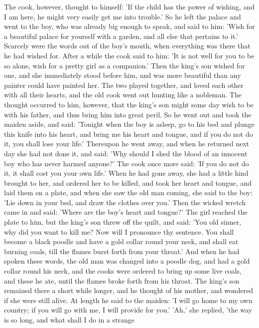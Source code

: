 \documentclass[12pt]{book}
\begin{document}
The cook, however, thought to himself: 'If the child has the power of
wishing, and I am here, he might very easily get me into trouble.' So
he left the palace and went to the boy, who was already big enough to
speak, and said to him: 'Wish for a beautiful palace for yourself with
a garden, and all else that pertains to it.' Scarcely were the words
out of the boy's mouth, when everything was there that he had wished
for. After a while the cook said to him: 'It is not well for you to be
so alone, wish for a pretty girl as a companion.' Then the king's son
wished for one, and she immediately stood before him, and was more
beautiful than any painter could have painted her. The two played
together, and loved each other with all their hearts, and the old cook
went out hunting like a nobleman. The thought occurred to him,
however, that the king's son might some day wish to be with his
father, and thus bring him into great peril. So he went out and took
the maiden aside, and said: 'Tonight when the boy is asleep, go to his
bed and plunge this knife into his heart, and bring me his heart and
tongue, and if you do not do it, you shall lose your life.' Thereupon
he went away, and when he returned next day she had not done it, and
said: 'Why should I shed the blood of an innocent boy who has never
harmed anyone?' The cook once more said: 'If you do not do it, it
shall cost you your own life.' When he had gone away, she had a little
hind brought to her, and ordered her to be killed, and took her heart
and tongue, and laid them on a plate, and when she saw the old man
coming, she said to the boy: 'Lie down in your bed, and draw the
clothes over you.' Then the wicked wretch came in and said: 'Where are
the boy's heart and tongue?' The girl reached the plate to him, but
the king's son threw off the quilt, and said: 'You old sinner, why did
you want to kill me? Now will I pronounce thy sentence. You shall
become a black poodle and have a gold collar round your neck, and
shall eat burning coals, till the flames burst forth from your
throat.' And when he had spoken these words, the old man was changed
into a poodle dog, and had a gold collar round his neck, and the cooks
were ordered to bring up some live coals, and these he ate, until the
flames broke forth from his throat. The king's son remained there a
short while longer, and he thought of his mother, and wondered if she
were still alive. At length he said to the maiden: 'I will go home to
my own country; if you will go with me, I will provide for you.' 'Ah,'
she replied, 'the way is so long, and what shall I do in a strange
\end{document}
